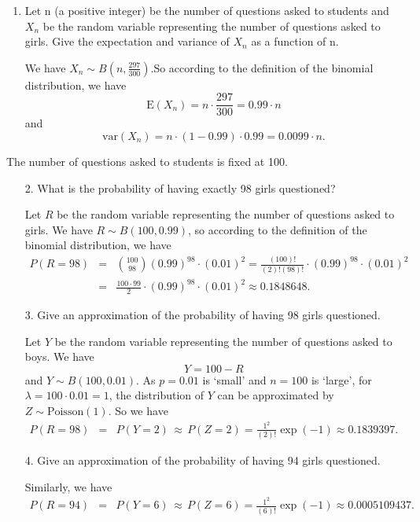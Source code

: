 \documentclass[12pt,thmsa]{article}\usepackage[]{graphicx}\usepackage[]{color}
\begin{document}
\begin{enumerate}
\item Let n (a positive integer) be the number of questions asked to students and $X_n$ be the random variable representing the number of questions asked to girls. Give the expectation and variance of $X_n$ as a function of n.

We have $X_n \sim B(n,\frac{297}{300})$.So according to the definition
of the binomial distribution, we have
$$
\text{E}(X_n) = n\cdot \frac{297}{300}= 0.99 \cdot n
$$
and
$$
\text{var}(X_n) = n \cdot (1-0.99)\cdot 0.99 = 0.0099 \cdot n.
$$
\end{enumerate}
\medskip

The number of questions asked to students is fixed at 100.

\begin{enumerate}
\item[2.] What is the probability of having exactly 98 girls questioned?

Let $R$ be the random variable representing the number of questions asked to girls. We have $ R \sim B (100,0.99) $, so according to the definition of the binomial distribution,
we have
\begin{eqnarray*}
P(R= 98)&=& \binom{100}{98} (0.99)^{98} \cdot (0.01)^{2} = \frac{(100)!}{(2)!(98)!} \cdot (0.99)^{98} \cdot (0.01)^{2} \\
&=& \frac{100\cdot 99}{2} \cdot (0.99)^{98} \cdot (0.01)^{2} \approx  0.1848648.
\end{eqnarray*}
\item[3.] Give an approximation of the probability of having 98 girls questioned.

Let $Y$ be the random variable representing the number of questions asked to boys. We have
$$ Y = 100-R $$ and $ Y \sim B (100,0.01) $. As $ p = 0.01 $ is `small' and $ n = 100 $  is `large', for $ \lambda = 100 \cdot 0.01 = 1 $, the distribution of $ Y $ can be approximated by $Z \sim \text {Poisson} (1) $. So we have
\begin{eqnarray*}
P(R= 98) &=& P(Y= 2) \,\approx\, P(Z=2) = \frac{1^{2}}{(2)!}\exp(-1) \approx  0.1839397.
\end{eqnarray*}
\item[4.] Give an approximation of the probability of having 94 girls questioned.

Similarly, we have
\begin{eqnarray*}
P(R= 94) &=& P(Y= 6) \,\approx\, P(Z=6) = \frac{1^{2}}{(6)!}\exp(-1) \approx   0.0005109437.
\end{eqnarray*}

\end{enumerate}
\end{document}
